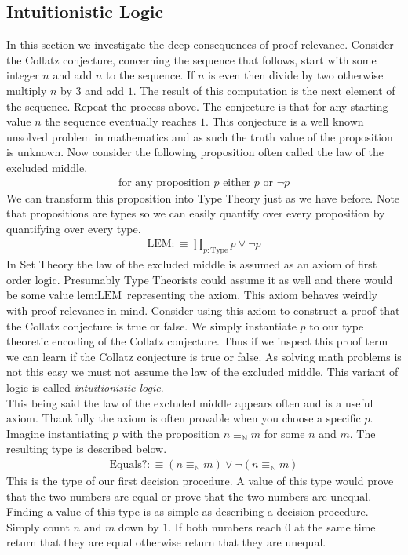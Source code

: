 \documentclass[./Thesis.tex]{subfiles}
\begin{document}
\subsection{Intuitionistic Logic}
In this section we investigate the deep consequences of proof relevance.
Consider the Collatz conjecture, concerning the sequence that follows, start with some
integer $n$ and add $n$ to the sequence. If $n$ is even then divide by two
otherwise multiply $n$ by $3$ and add $1$. The result of this computation is the
next element of the sequence. Repeat the process above. The conjecture is
that for any starting value $n$ the sequence eventually reaches $1$. This
conjecture is a well known unsolved problem in mathematics and as such the truth
value of the proposition is unknown. Now consider the following proposition
often called the law of the excluded middle.
\begin{align}
  \label{eqn:set-LEM}
  \text{for any proposition } p \text{ either } p \text{ or } \neg p
\end{align}
We can transform this proposition into Type Theory just as we have before. Note
that propositions are types so we can easily quantify over every proposition by
quantifying over every type.
\begin{align}
  \label{eqn:set-LEM}
  \text{LEM} :\equiv \prod_{p  : \text{Type}} p \vee \neg p
\end{align}
In Set Theory the law of the excluded middle is assumed as an axiom of first
order logic. Presumably Type Theorists could assume it as well and there would
be some value $\text{lem} : \text{LEM}$ representing the axiom. This axiom behaves weirdly
with proof relevance in mind. Consider using this axiom to construct a proof
that the Collatz conjecture is true or false. We simply instantiate $p$ to our
type theoretic encoding of the Collatz conjecture. Thus if we inspect this proof
term we can learn if the Collatz conjecture is true or false. As solving math
problems is not this easy we must not assume the law of the excluded middle.
This variant of logic is called \textit{intuitionistic logic}. \\

This being said the law of the excluded middle appears often
and is a useful axiom. Thankfully the axiom is often provable when you choose a
specific $p$. Imagine instantiating $p$ with the proposition
$n \equiv_{\mathbb{N}} m$ for some $n$ and $m$.
The resulting type is described below.
\begin{align}
  \label{eqn:nat-dec}
  \text{Equals?} :\equiv (n \equiv_{\mathbb{N}} m) \vee \neg (n \equiv_{\mathbb{N}} m)
\end{align}
This is the type of our first decision procedure. A value of this type would
prove that the two numbers are equal or prove that the two numbers are unequal.
Finding a value of this type is as simple as describing a decision procedure.
Simply count $n$ and $m$ down by $1$. If both numbers reach $0$ at the same time
return that they are equal otherwise return that they are unequal. \\
\end{document}
